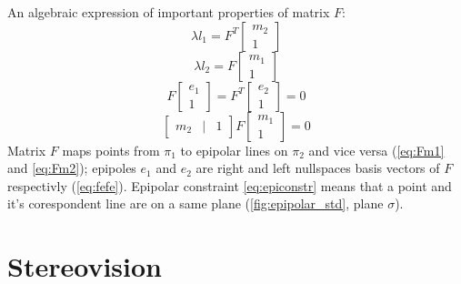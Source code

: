 An algebraic expression of important properties of matrix $F$:
\begin{equation}
    \label{eq:Fm2}
    \lambda l_1 = F^T \begin{bmatrix} m_2 \\ 1 \end{bmatrix}    
\end{equation}
\begin{equation}
    \label{eq:Fm1}
    \lambda l_2 = F \begin{bmatrix} m_1 \\ 1 \end{bmatrix}    
\end{equation}
\begin{equation}
    \label{eq:fefe}
    F \begin{bmatrix} e_1 \\ 1 \end{bmatrix} = F^T \begin{bmatrix} e_2 \\ 1 \end{bmatrix} = 0    
\end{equation}
\begin{equation}
    \label{eq:epiconstr}
    \begin{bmatrix} m_2 & | & 1 \end{bmatrix} F \begin{bmatrix} m_1 \\ 1 \end{bmatrix} = 0    
\end{equation}
Matrix $F$ maps points from $\pi_1$ to epipolar lines on $\pi_2$ and vice versa (\autoref{eq:Fm1} and \autoref{eq:Fm2}); epipoles $e_1$ and $e_2$ are right and left nullspaces basis vectors of $F$ respectivly (\autoref{eq:fefe}).
Epipolar constraint \autoref{eq:epiconstr} means that a point and it's corespondent line are on a same plane (\autoref{fig:epipolar_std}, plane $\sigma$).

\section{Stereovision}

